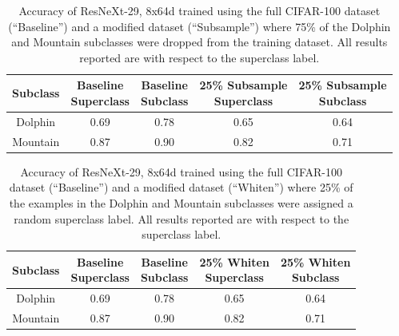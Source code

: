 \documentclass{article}
\begin{document}
\begin{table}[]
\centering
\begin{tabular}{|c|c|c|c|c|}
\hline
 Subclass & \makecell{Baseline \\ Superclass} & \makecell{Baseline \\ Subclass}   &  \makecell{25\% Subsample \\ Superclass}    & \makecell{25\% Subsample \\ Subclass}   \\
 \hline
 Dolphin & 0.69 & 0.78  & 0.65  & 0.64  \\
 Mountain & 0.87 & 0.90  & 0.82 & 0.71  \\
 \hline
\end{tabular}
\caption{Accuracy of ResNeXt-29, 8x64d trained using the full CIFAR-100 dataset (``Baseline'') and a modified dataset (``Subsample'') where 75\% of the Dolphin and Mountain subclasses were dropped from the training dataset.  All results reported are with respect to the superclass label.}
\label{tab:cifar1}
\vspace{-4mm}
\end{table}

\begin{table}[]
\centering
\begin{tabular}{|c|c|c|c|c|}
 \hline
 Subclass & \makecell{Baseline \\ Superclass} & \makecell{Baseline \\ Subclass}   &  \makecell{25\% Whiten \\ Superclass}    & \makecell{25\% Whiten \\ Subclass}   \\
 \hline 
 Dolphin & 0.69 & 0.78  & 0.65  & 0.64  \\
 Mountain & 0.87 & 0.90  & 0.82 & 0.71  \\
 \hline
\end{tabular}
\caption{Accuracy of ResNeXt-29, 8x64d trained using the full CIFAR-100 dataset (``Baseline'') and a modified dataset (``Whiten'') where 25\% of the examples in the Dolphin and Mountain subclasses were assigned a random superclass label.  All results reported are with respect to the superclass label.
}
\label{tab:cifar2}
\vspace{-8mm}
\end{table}

\end{document}
